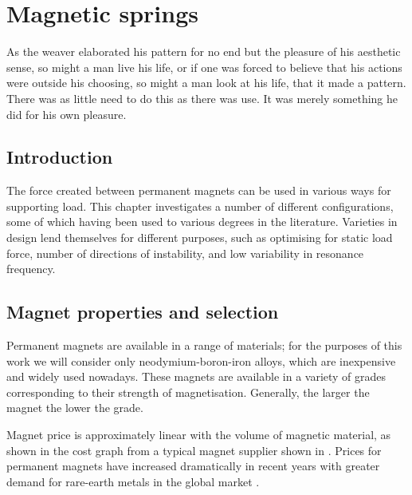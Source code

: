 \documentclass[11pt,a4paper]{memoir}
\begin{document}
\chapter{Magnetic springs}

\epigraph {
  As the weaver elaborated his pattern for no end but the pleasure of his aesthetic sense, so might a man live his life, or if one was forced to believe that his actions were outside his choosing, so might a man look at his life, that it made a pattern.
  There was as little need to do this as there was use.
  It was merely something he did for his own pleasure.
}
{}

\section{Introduction}

The force created between permanent magnets can be used in various ways for supporting load.
This chapter investigates a number of different configurations, some of which having been used to various degrees in the literature.
Varieties in design lend themselves for different purposes, such as optimising for static load force, number of directions of instability, and low variability in resonance frequency.


\section{Magnet properties and selection}

Permanent magnets are available in a range of materials; for the purposes of this work we will consider only neodymium-boron-iron alloys, which are inexpensive and widely used nowadays.
These magnets are available in a variety of grades corresponding to their strength of magnetisation.
Generally, the larger the magnet the lower the grade.

Magnet price is approximately linear with the volume of magnetic material, as shown in the cost graph from a typical magnet supplier shown in .
Prices for permanent magnets have increased dramatically in recent years with greater demand for rare-earth metals in the global market \cite{coey2011-ietm}.

\begin{figure}
\end{figure}
\end{document}
